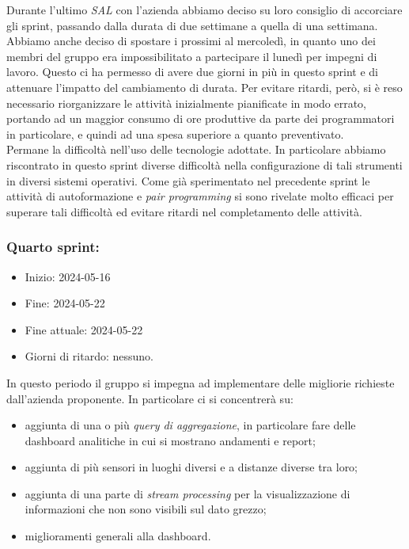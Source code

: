 Durante l'ultimo \textit{SAL} con l'azienda abbiamo deciso su loro consiglio di accorciare gli sprint, passando dalla durata di due settimane a quella di una settimana. Abbiamo anche deciso di spostare i prossimi al mercoledì, in quanto uno dei membri del gruppo era impossibilitato a partecipare il lunedì per impegni di lavoro. Questo ci ha permesso di avere due giorni in più in questo sprint e di attenuare l'impatto del cambiamento di durata. Per evitare ritardi, però, si è reso necessario riorganizzare le attività inizialmente pianificate in modo errato, portando ad un maggior consumo di ore produttive da parte dei programmatori in particolare, e quindi ad una spesa superiore a quanto preventivato. \\
Permane la difficoltà nell'uso delle tecnologie adottate. In particolare abbiamo riscontrato in questo sprint diverse difficoltà nella configurazione di tali strumenti in diversi sistemi operativi. Come già sperimentato nel precedente sprint le attività di autoformazione e \textit{pair programming} si sono rivelate molto efficaci per superare tali difficoltà ed evitare ritardi nel completamento delle attività.


\newpage
\subsubsection{Quarto sprint:}
\begin{itemize}
    \item Inizio: 2024-05-16
    \item Fine: 2024-05-22
    \item Fine attuale: 2024-05-22
    \item Giorni di ritardo: nessuno.
\end{itemize}

In questo periodo il gruppo si impegna ad implementare delle migliorie richieste dall'azienda proponente.
In particolare ci si concentrerà su:
\begin{itemize}
    \item aggiunta di una o più \textit{query di aggregazione}, in particolare fare delle dashboard analitiche in cui si
        mostrano andamenti e report;
    \item aggiunta di più sensori in luoghi diversi e a distanze diverse tra loro;
    \item aggiunta di una parte di \textit{stream processing} per la visualizzazione di informazioni che non sono
        visibili sul dato grezzo;
    \item miglioramenti generali alla dashboard.
\end{itemize}

